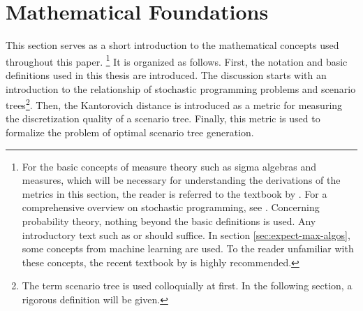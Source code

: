 \section{Mathematical Foundations}
\label{sec:math-foundations}
This section serves as a short introduction to the mathematical concepts used throughout this paper.
\footnote{For the basic concepts of measure theory such as sigma algebras and measures, which will be necessary for understanding the derivations of the metrics in this section, the reader is referred to the textbook by .
For a comprehensive overview on stochastic programming, see .
Concerning probability theory, nothing beyond the basic definitions is used.
Any introductory text such as  or  should suffice.
In section \ref{sec:expect-max-algos}, some concepts from machine learning are used.
To the reader unfamiliar with these concepts, the recent textbook by  is highly recommended.}
It is organized as follows.
First, the notation and basic definitions used in this thesis are introduced.
The discussion starts with an introduction to the relationship of stochastic programming problems and scenario trees\footnote{The term scenario tree is used colloquially at first. In the following section, a rigorous definition will be given.}.
Then, the Kantorovich distance is introduced as a metric for measuring the discretization quality of a scenario tree.
Finally, this metric is used to formalize the problem of optimal scenario tree generation.
